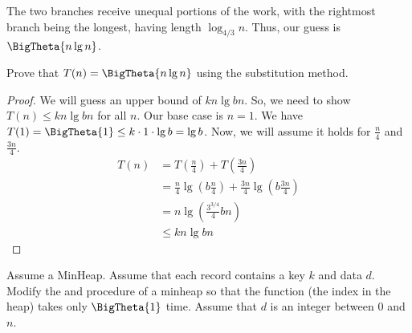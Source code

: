 \documentclass[12pt,letterpaper]{hmcpset}
\begin{document}
\begin{solution}

The two branches receive unequal portions of the work, with the rightmost branch being the longest, having length $\log_{4/3} n$.  Thus, our guess is $\BigTheta{n\lg n}$.
\end{solution}

\begin{problem}[3b]
Prove that $T(n) = \BigTheta{n\lg n}$ using the substitution method.
\end{problem}

\begin{solution}
\begin{proof}
We will guess an upper bound of $kn\lg bn$.  So, we need to show $T(n) \leq kn\lg bn$ for all $n$.  Our base case is $n = 1$.  We have $T(1) = \BigTheta{1} \leq k\cdot 1 \cdot \lg b =\lg b$.  Now, we will assume it holds for $\frac{n}{4}$ and $\frac{3n}{4}$.
\begin{align*}
T(n) &= T(\frac{n}{4}) + T(\frac{3n}{4}) \\
{} &= \frac{n}{4} \lg\left(b\frac{n}{4}\right) + \frac{3n}{4} \lg\left(b\frac{3n}{4}\right) \\
{} &= n \lg (\frac{3^{3/4}}{4}b n)\\
{} &\leq kn\lg bn
\end{align*}
\end{proof}
\end{solution}

\begin{problem}
Assume a MinHeap.  Assume that each record contains a key $k$ and data $d$.  Modify the  and  procedure of a minheap so that the function  (the index in the heap) takes only $\BigTheta{1}$ time.  Assume that $d$ is an integer between 0 and $n$.
\end{problem}
\end{document}
